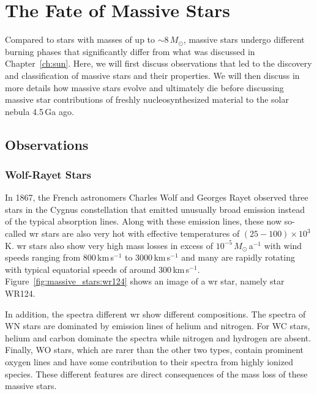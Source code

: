 
\chapter{The Fate of Massive Stars}\label{ch:massive_stars}
Compared to stars with masses of up to $\sim 8\,M_\odot$, massive stars undergo different burning phases that significantly differ from what was discussed in Chapter~\ref{ch:sun}. Here, we will first discuss observations that led to the discovery and classification of massive stars and their properties. We will then discuss in more details how massive stars evolve and ultimately die before discussing massive star contributions of freshly nucleosynthesized material to the solar nebula 4.5\,Ga ago.

\section{Observations}

\subsection{Wolf-Rayet Stars} In 1867, the French astronomers Charles Wolf and Georges Rayet observed three stars in the Cygnus constellation that emitted unusually broad emission instead of the typical absorption lines. Along with these emission lines, these now so-called \ac{wr} stars are also very hot with effective temperatures of $(25 - 100)\times 10^{3}$\,K. \ac{wr} stars also show very high mass losses in excess of $10^{-5}\,M_\odot$\,a$^{-1}$ with wind speeds ranging from 800\,km\,s$^{-1}$ to 3000\,km\,s$^{-1}$ and many are rapidly rotating with typical equatorial speeds of around 300\,km\,s$^{-1}$. Figure~\ref{fig:massive_stars:wr124} shows an image of a \ac{wr} star, namely star WR124. 

In addition, the spectra different \ac{wr} show different compositions. The spectra of WN stars are dominated by emission lines of helium and nitrogen. For WC stars, helium and carbon dominate the spectra while nitrogen and hydrogen are absent. Finally, WO stars, which are rarer than the other two types, contain prominent oxygen lines and have some contribution to their spectra from highly ionized species. These different features are direct consequences of the mass loss of these massive stars.


